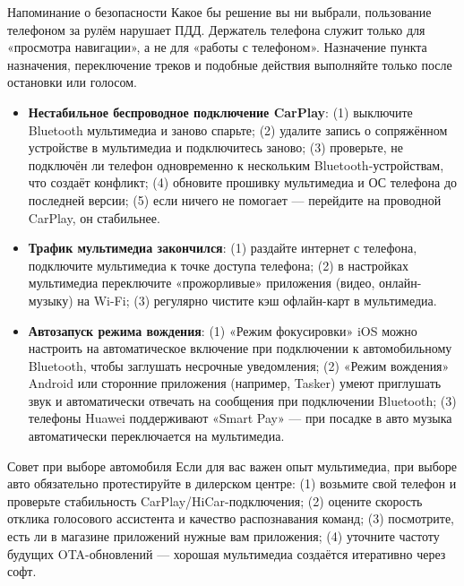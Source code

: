 \begin{tcbwarn}{Напоминание о безопасности}
Какое бы решение вы ни выбрали, пользование телефоном за рулём нарушает ПДД. Держатель телефона служит только для «просмотра навигации», а не для «работы с телефоном». Назначение пункта назначения, переключение треков и подобные действия выполняйте только после остановки или голосом.

\end{tcbwarn}


\begin{itemize}
  \item \textbf{Нестабильное беспроводное подключение CarPlay}: (1) выключите Bluetooth мультимедиа и заново спарьте; (2) удалите запись о сопряжённом устройстве в мультимедиа и подключитесь заново; (3) проверьте, не подключён ли телефон одновременно к нескольким Bluetooth-устройствам, что создаёт конфликт; (4) обновите прошивку мультимедиа и ОС телефона до последней версии; (5) если ничего не помогает — перейдите на проводной CarPlay, он стабильнее.
  \item \textbf{Трафик мультимедиа закончился}: (1) раздайте интернет с телефона, подключите мультимедиа к точке доступа телефона; (2) в настройках мультимедиа переключите «прожорливые» приложения (видео, онлайн-музыку) на Wi-Fi; (3) регулярно чистите кэш офлайн-карт в мультимедиа.
  \item \textbf{Автозапуск режима вождения}: (1) «Режим фокусировки» iOS можно настроить на автоматическое включение при подключении к автомобильному Bluetooth, чтобы заглушать несрочные уведомления; (2) «Режим вождения» Android или сторонние приложения (например, Tasker) умеют приглушать звук и автоматически отвечать на сообщения при подключении Bluetooth; (3) телефоны Huawei поддерживают «Smart Pay» — при посадке в авто музыка автоматически переключается на мультимедиа.
\end{itemize}

\begin{tcbinfo}{Совет при выборе автомобиля}
Если для вас важен опыт мультимедиа, при выборе авто обязательно протестируйте в дилерском центре: (1) возьмите свой телефон и проверьте стабильность CarPlay/HiCar-подключения; (2) оцените скорость отклика голосового ассистента и качество распознавания команд; (3) посмотрите, есть ли в магазине приложений нужные вам приложения; (4) уточните частоту будущих OTA-обновлений — хорошая мультимедиа создаётся итеративно через софт.

\end{tcbinfo}


